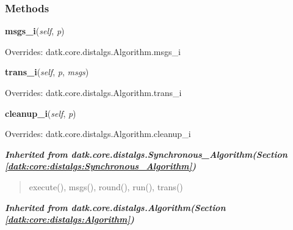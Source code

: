   \subsubsection{Methods}

    \vspace{0.5ex}

\hspace{.8\funcindent}\begin{boxedminipage}{\funcwidth}

    \raggedright \textbf{msgs\_i}(\textit{self}, \textit{p})

\setlength{\parskip}{2ex}
\setlength{\parskip}{1ex}
      Overrides: datk.core.distalgs.Algorithm.msgs\_i

    \end{boxedminipage}

    \vspace{0.5ex}

\hspace{.8\funcindent}\begin{boxedminipage}{\funcwidth}

    \raggedright \textbf{trans\_i}(\textit{self}, \textit{p}, \textit{msgs})

\setlength{\parskip}{2ex}
\setlength{\parskip}{1ex}
      Overrides: datk.core.distalgs.Algorithm.trans\_i

    \end{boxedminipage}

    \vspace{0.5ex}

\hspace{.8\funcindent}\begin{boxedminipage}{\funcwidth}

    \raggedright \textbf{cleanup\_i}(\textit{self}, \textit{p})

\setlength{\parskip}{2ex}
\setlength{\parskip}{1ex}
      Overrides: datk.core.distalgs.Algorithm.cleanup\_i

    \end{boxedminipage}


\large{\textbf{\textit{Inherited from datk.core.distalgs.Synchronous\_Algorithm\textit{(Section \ref{datk:core:distalgs:Synchronous_Algorithm})}}}}

\begin{quote}
execute(), msgs(), round(), run(), trans()
\end{quote}

\large{\textbf{\textit{Inherited from datk.core.distalgs.Algorithm\textit{(Section \ref{datk:core:distalgs:Algorithm})}}}}

